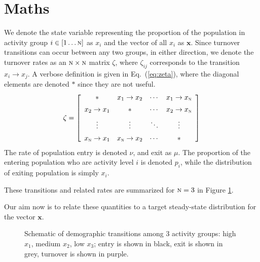 \documentclass{article}
\newcommand{\N}{\textsc{n}}
\begin{document}
\section{Maths}
We denote the state variable representing
the proportion of the population in activity group $i \in [1 \dots \N]$ as $x_i$
and the vector of all $x_i$ as $\bm{x}$.
Since turnover transitions can occur between any two groups, in either direction,
we denote the turnover rates as an $\N \times \N$ matrix $\zeta$,
where $\zeta_{ij}$ corresponds to the transition $x_i \rightarrow x_j$.
A verbose definition is given in Eq.~(\ref{eq:zeta}),
where the diagonal elements are denoted $*$ since they are not useful.
\begin{equation}\label{eq:zeta}
\zeta = \left[\begin{array}{cccc}
	         *           & x_1  \rightarrow x_2 & \cdots & x_1 \rightarrow x_\N \\[0.5em]
	x_2  \rightarrow x_1 &          *           & \cdots & x_2 \rightarrow x_\N \\[0.5em]
	      \vdots         &       \vdots         & \ddots &       \vdots         \\[0.5em]
	x_\N \rightarrow x_1 & x_\N \rightarrow x_2 & \cdots &          *
\end{array}\right]
\end{equation}
The rate of population entry is denoted $\nu$, and exit as $\mu$.
The proportion of the entering population who are activity level $i$ is denoted $p_i$,
while the distribution of exiting population is simply $x_i$.
\par
These transitions and related rates are summarized for $\N = 3$ in Figure \ref{fig:turnover}.
\par
Our aim now is to relate these quantities to
a target steady-state distribution for the vector $\bm{x}$.
\begin{figure}
  \centering
  
  \caption{Schematic of demographic transitions among 3 activity groups:
    high $x_1$, medium $x_2$, low $x_3$;
    entry is shown in black,
    exit is shown in grey,
    turnover is shown in purple.}%
  \label{fig:turnover}
\end{figure}
\end{document}
